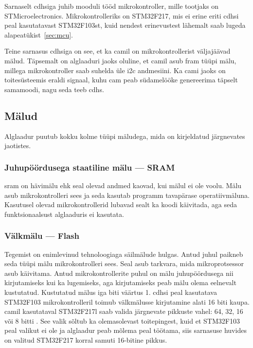 \documentclass[12pt,a4paper]{article}
\begin{document}
Sarnaselt \gls{cdhs}iga juhib mooduli tööd mikrokontroller, mille tootjaks on
STMicroelectronics. Mikrokontrolleriks on STM32F217, mis ei erine eriti
\gls{cdhs}i peal kasutatavast STM32F103st, kuid nendest erinevustest lähemalt
saab lugeda alapeatükist~\ref{sec:mcu}.

Teine sarnasus \gls{cdhs}iga on see, et ka \gls{cam}il on mikrokontrollerist
välja\-jäävad mälud. Täpsemalt on alglaaduri jaoks oluline, et \gls{cam}il asub
\gls{fram} tüüpi mälu, millega mikrokontroller saab suhelda üle \gls{i2c}
andmesiini.  Ka \gls{cam}i jaoks on toitesüsteemis eraldi signaal, kuhu
\gls{cam} peab südamelööke genereerima täpselt samamoodi, nagu seda teeb
\gls{cdhs}.

\subsection{Mälud}
\label{sec:m2lud}
Alglaadur puutub kokku kolme tüüpi mäludega, mida on kirjeldatud järgne\-vates
jaotistes.

\subsubsection{Juhupöördusega staatiline mälu --- SRAM}
\Gls{sram} on hävimälu ehk seal olevad andmed kaovad, kui mälul ei ole voolu.
Mälu asub mikrokontrolleri sees ja seda kasutab programm tavapärase
operatiivmäluna.  Kasutusel olevad mikrokontrollerid lubavad sealt ka
koodi käivitada, aga seda funktsionaalsust alglaaduris ei kasutata.

\subsubsection{Välkmälu --- Flash}
Tegemist on enimlevinud tehnoloogiaga säilmälude hulgas. Antud juhul paikneb
seda tüüpi mälu mikrokontrolleri sees. Seal asub tarkvara, mida mikroprotsessor
asub käivitama. Antud mikrokontrollerite puhul on mälu juhupöördusega nii
kirjutamiseks kui ka lugemiseks, aga kirjutamiseks peab mälu olema eelnevalt
kustutatud. Kustutatud mälus iga biti väärtus 1. \Gls{cdhs}i peal kasutatava
STM32F103 mikrokontrolleril toimub välkmälusse kirjutamine alati 16 biti kaupa.
\gls{cam}il kasutataval STM32F217l saab valida järgnevate pikkuste vahel: 64,
32, 16 või 8 bitti \cite{f2fpm}. See valik sõltub ka olemasolevast toitepingest,
kuid et STM32F103 peal valikut ei ole ja alglaadur peab mõlema peal töötama,
siis sarnasuse huvides on valitud STM32F217 korral samuti 16-bitine pikkus.
\end{document}
